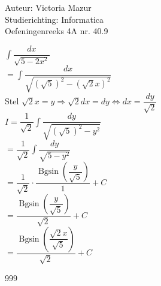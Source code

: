 \documentclass[a4paper]{article}
\begin{document}
  
\noindent \large Auteur: Victoria Mazur \\
\noindent \large Studierichting: Informatica\\
\noindent \large Oefeningenreeks 4A nr. 40.9\\

\medskip

\normalsize

$ \displaystyle\int \dfrac{dx}{\sqrt{5-2x^2}} $ \\

$ = \displaystyle\int \dfrac{dx}{\sqrt{(\sqrt{5})^2 - (\sqrt{2}x)^2}} $ \\

Stel $\sqrt{2}x = y \Rightarrow \sqrt{2}dx = dy \Leftrightarrow dx = \dfrac{dy}{\sqrt{2}}$ \\

$ I = \dfrac{1}{\sqrt{2}} \displaystyle\int \dfrac{dy}{\sqrt{(\sqrt{5})^2 - y^2}} $ \\

$ = \dfrac{1}{\sqrt{2}} \displaystyle\int \dfrac{dy}{\sqrt{5 - y^2}} $ \\

$ = \dfrac{1}{\sqrt{2}} \cdot \dfrac{\operatorname{Bgsin}\left(\dfrac{y}{\sqrt{5}}\right)}{1} + C $ \\

$ = \dfrac{\operatorname{Bgsin}\left(\dfrac{y}{\sqrt{5}}\right)}{\sqrt{2}} + C $ \\

$ = \dfrac{\operatorname{Bgsin}\left(\dfrac{\sqrt{2}x}{\sqrt{5}}\right)}{\sqrt{2}} + C $ \\

\begin{thebibliography}{999}
\end{thebibliography}
\end{document}
